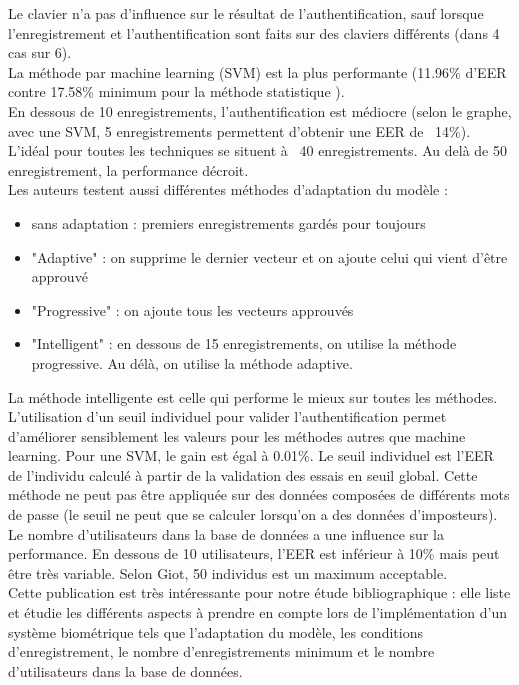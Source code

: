Le clavier n'a pas d'influence sur le résultat de l'authentification, sauf lorsque l'enregistrement et l'authentification sont faits sur des claviers différents (dans 4 cas sur 6).\\

La méthode par machine learning (SVM) est la plus performante (11.96\% d'EER contre 17.58\% minimum pour la méthode statistique ).\\

En dessous de 10 enregistrements, l'authentification est médiocre (selon le graphe, avec une SVM, 5 enregistrements permettent d'obtenir une EER de ~14\%). L'idéal pour toutes les techniques se situent à ~40 enregistrements. Au delà de 50 enregistrement, la performance décroit.\\

Les auteurs testent aussi différentes méthodes d'adaptation du modèle :\\

\begin{itemize}
  \item sans adaptation : premiers enregistrements gardés pour toujours
  \item "Adaptive" : on supprime le dernier vecteur et on ajoute celui qui vient d'être approuvé
  \item "Progressive" : on ajoute tous les vecteurs approuvés
  \item "Intelligent" : en dessous de 15 enregistrements, on utilise la méthode progressive. Au délà, on utilise la méthode adaptive.
\end{itemize}

La méthode intelligente est celle qui performe le mieux sur toutes les méthodes.\\

L'utilisation d'un seuil individuel pour valider l'authentification permet d'améliorer sensiblement les valeurs pour les méthodes autres que machine learning. Pour une SVM, le gain est égal à 0.01\%. Le seuil individuel est l'EER de l'individu calculé à partir de la validation des essais en seuil global. Cette méthode ne peut pas être appliquée sur des données composées de différents mots de passe (le seuil ne peut que se calculer lorsqu'on a des données d'imposteurs).\\

Le nombre d'utilisateurs dans la base de données a une influence sur la performance. En dessous de 10 utilisateurs, l'EER est inférieur à 10\% mais peut être très variable. Selon Giot, 50 individus est un maximum acceptable.\\

Cette publication est très intéressante pour notre étude bibliographique : elle liste et étudie les différents aspects à prendre en compte lors de l'implémentation d'un système biométrique tels que l'adaptation du modèle, les conditions d'enregistrement, le nombre d'enregistrements minimum et le nombre d'utilisateurs dans la base de données.
